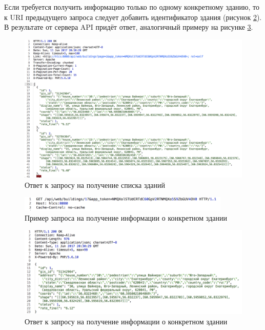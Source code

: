 	Если требуется получить информацию только по одному конкретному зданию, то к URI предыдущего запроса следует добавить идентификатор здания (рисунок \ref{query:buildings_get_one_to}). В результате от сервера API придёт ответ, аналогичный примеру на рисунке \ref{query:buildings_get_one_from}.

	\pagebreak

	\begin{figure}[t!]
		\centering
		\includegraphics[width=1\textwidth]{images/queries/buildings_get_from}
		\caption{Ответ к запросу на получение списка зданий}
		\label{query:buildings_get_from}
	\end{figure}

	\begin{figure}[t!]
		\centering
		\includegraphics[width=0.9\textwidth]{images/queries/buildings_get_one_to}
		\caption{Пример запроса на получение информации о конкретном здании}
		\label{query:buildings_get_one_to}
	\end{figure}

	\begin{figure}[t!]
		\centering
		\includegraphics[width=1\textwidth]{images/queries/buildings_get_one_from}
		\caption{Ответ к запросу на получение информации о конкретном здании}
		\label{query:buildings_get_one_from}
	\end{figure}

